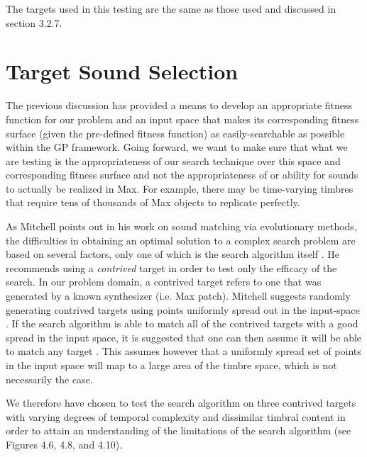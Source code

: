 \documentclass[a4paper,12pt]{report} 	%
\numberwithin{figure}{chapter}
\numberwithin{table}{chapter}
\numberwithin{equation}{chapter}
\begin{document}
\begin{flushleft}
The targets used in this testing are the same as those used and discussed in section 3.2.7.

\section{Target Sound Selection}

The previous discussion has provided a means to develop an appropriate fitness function for our problem and an input space that makes its corresponding fitness surface (given the pre-defined fitness function) as easily-searchable as possible within the GP framework. Going forward, we want to make sure that what we are testing is the appropriateness of our search technique over this space and corresponding fitness surface and not the appropriateness of or ability for sounds to actually be realized in Max. For example, there may be time-varying timbres that require tens of thousands of Max objects to replicate perfectly.

As Mitchell points out in his work on sound matching via evolutionary methods, the difficulties in obtaining an optimal solution to a complex search problem are based on several factors, only one of which is the search algorithm itself \cite[p. 1]{Mitchell:2007fe}. He recommends using a \emph{contrived} target in order to test only the efficacy of the search. In our problem domain, a contrived target refers to one that was generated by a known synthesizer (i.e. Max patch). Mitchell suggests randomly generating contrived targets using points uniformly spread out in the input-space \cite[p. 2]{Mitchell:2007fe}. If the search algorithm is able to match all of the contrived targets with a good spread in the input space, it is suggested that one can then assume it will be able to match any target \cite[p. 2]{Mitchell:2007fe}. This assumes however that a uniformly spread set of points in the input space will map to a large area of the timbre space, which is not necessarily the case.

We therefore have chosen to test the search algorithm on three contrived targets with varying degrees of temporal complexity and dissimilar timbral content in order to attain an understanding of the limitations of the search algorithm (see Figures 4.6, 4.8, and 4.10). 


\end{flushleft}
\end{document}
